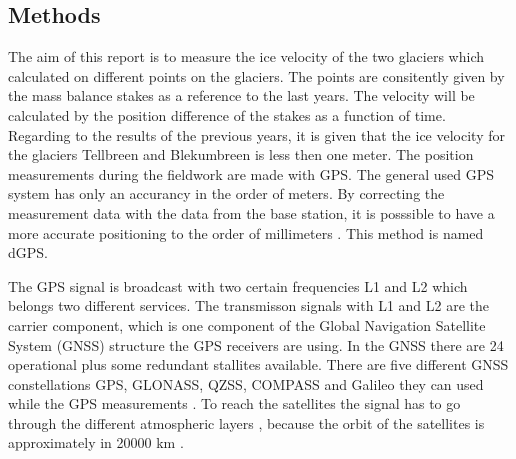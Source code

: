 
\subsection{Methods}\label{GPS:subsec:methods}

The aim of this report is to measure the ice velocity of the two glaciers which calculated on different points on the glaciers. 
The points are consitently given by the mass balance stakes as a reference to the last years.
The velocity will be calculated by the position difference of the stakes as a function of time.
Regarding to the results of the previous years, it is given that the ice velocity for the glaciers Tellbreen and Blekumbreen is less then one meter.
The position measurements during the fieldwork are made with GPS. 
The general used GPS system has only an accurancy in the order of meters.
By correcting the measurement data with the data from the base station, it is posssible to have a more accurate positioning to the order of millimeters \citep{UGPS}. This method is named dGPS.
\medskip

The GPS signal is broadcast with two certain frequencies L1 and L2 which belongs two different services.
The transmisson signals with L1 and L2 are the carrier component, which is one component of the Global Navigation Satellite System (GNSS) structure the GPS receivers are using.
In the GNSS there are 24 operational plus some redundant stallites available.
There are five different GNSS constellations GPS, GLONASS, QZSS, COMPASS and Galileo they can used while the GPS measurements \citep{Trprocess}.
To reach the satellites the signal has to go through the different atmospheric layers \citep{curcherdgps}, because the orbit of the satellites is approximately in 20000 km \citep{Trprocess}.
\medskip

